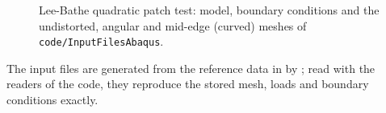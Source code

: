 \begin{figure}[htbp]
  \centering
  
  \caption{Lee-Bathe quadratic patch test: model, boundary conditions and the
    undistorted, angular and mid-edge (curved) meshes of
    \texttt{code/InputFilesAbaqus}.}
  \label{fig:leebathe}
\end{figure}

The input files are generated from the reference data in
 by ;
read with the readers of the code, they reproduce the stored mesh, loads and
boundary conditions exactly.
